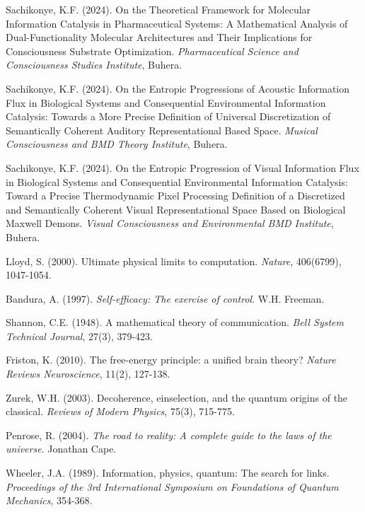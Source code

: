 \documentclass[11pt,a4paper]{article}
\theoremstyle{remark}
\begin{document}
\begin{thebibliography}{99}
Sachikonye, K.F. (2024). On the Theoretical Framework for Molecular Information Catalysis in Pharmaceutical Systems: A Mathematical Analysis of Dual-Functionality Molecular Architectures and Their Implications for Consciousness Substrate Optimization. \textit{Pharmaceutical Science and Consciousness Studies Institute}, Buhera.

Sachikonye, K.F. (2024). On the Entropic Progressions of Acoustic Information Flux in Biological Systems and Consequential Environmental Information Catalysis: Towards a More Precise Definition of Universal Discretization of Semantically Coherent Auditory Representational Based Space. \textit{Musical Consciousness and BMD Theory Institute}, Buhera.

Sachikonye, K.F. (2024). On the Entropic Progression of Visual Information Flux in Biological Systems and Consequential Environmental Information Catalysis: Toward a Precise Thermodynamic Pixel Processing Definition of a Discretized and Semantically Coherent Visual Representational Space Based on Biological Maxwell Demons. \textit{Visual Consciousness and Environmental BMD Institute}, Buhera.

Lloyd, S. (2000). Ultimate physical limits to computation. \textit{Nature}, 406(6799), 1047-1054.

Bandura, A. (1997). \textit{Self-efficacy: The exercise of control}. W.H. Freeman.

Shannon, C.E. (1948). A mathematical theory of communication. \textit{Bell System Technical Journal}, 27(3), 379-423.

Friston, K. (2010). The free-energy principle: a unified brain theory? \textit{Nature Reviews Neuroscience}, 11(2), 127-138.

Zurek, W.H. (2003). Decoherence, einselection, and the quantum origins of the classical. \textit{Reviews of Modern Physics}, 75(3), 715-775.

Penrose, R. (2004). \textit{The road to reality: A complete guide to the laws of the universe}. Jonathan Cape.

Wheeler, J.A. (1989). Information, physics, quantum: The search for links. \textit{Proceedings of the 3rd International Symposium on Foundations of Quantum Mechanics}, 354-368.


\end{thebibliography}
\end{document}
